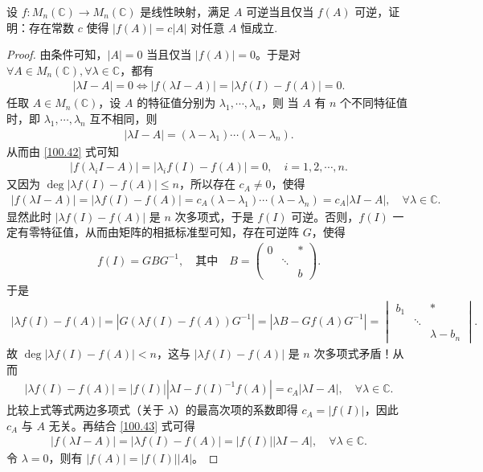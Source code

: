 \documentclass[../../main.tex]{subfiles}
\begin{document}
\begin{example}
设 $f: M_n(\mathbb{C}) \to M_n(\mathbb{C})$ 是线性映射，满足 $A$ 可逆当且仅当 $f(A)$ 可逆，证明：存在常数 $c$ 使得 $|f(A)| = c|A|$ 对任意 $A$ 恒成立. 
\end{example}
\begin{proof}
由条件可知，$|A| = 0$ 当且仅当 $|f(A)| = 0$。于是对 $\forall A \in M_n(\mathbb{C}), \forall \lambda \in \mathbb{C}$，都有
\begin{align}
|\lambda I - A| = 0 \Longleftrightarrow |f(\lambda I - A)| = |\lambda f(I) - f(A)| = 0. \label{100.42}
\end{align}
任取 $A \in M_n(\mathbb{C})$，设 $A$ 的特征值分别为 $\lambda_1, \cdots, \lambda_n$，则
当 $A$ 有 $n$ 个不同特征值时，即 $\lambda_1, \cdots, \lambda_n$ 互不相同，则
\begin{align*}
|\lambda I - A| = (\lambda - \lambda_1) \cdots (\lambda - \lambda_n).
\end{align*}
从而由 \eqref{100.42} 式可知
\begin{align*}
|f(\lambda_i I - A)| = |\lambda_i f(I) - f(A)| = 0, \quad i = 1, 2, \cdots, n.
\end{align*}
又因为 $\deg |\lambda f(I) - f(A)| \leqslant n$，所以存在 $c_A \ne 0$，使得
\begin{align}
|f(\lambda I - A)| = |\lambda f(I) - f(A)| = c_A (\lambda - \lambda_1) \cdots (\lambda - \lambda_n) = c_A |\lambda I - A|, \quad \forall \lambda \in \mathbb{C}. \label{100.43}
\end{align}
显然此时 $|\lambda f(I) - f(A)|$ 是 $n$ 次多项式，于是 $f(I)$ 可逆。否则，$f(I)$ 一定有零特征值，从而由矩阵的相抵标准型可知，存在可逆阵 $G$，使得
\begin{align*}
f(I) = G B G^{-1}, \quad \text{其中} \quad B = \begin{pmatrix}
0 & & * \\
& \ddots & \\
& & b
\end{pmatrix}.
\end{align*}
于是
\begin{align*}
|\lambda f(I) - f(A)| = |G (\lambda f(I) - f(A)) G^{-1}| = |\lambda B - G f(A) G^{-1}| = \begin{vmatrix}
b_1 & & * \\
& \ddots & \\
& & \lambda - b_n
\end{vmatrix}.
\end{align*}
故 $\deg |\lambda f(I) - f(A)| < n$，这与 $|\lambda f(I) - f(A)|$ 是 $n$ 次多项式矛盾！从而
\begin{align*}
|\lambda f(I) - f(A)| = |f(I)| |\lambda I - f(I)^{-1} f(A)| = c_A |\lambda I - A|, \quad \forall \lambda \in \mathbb{C}.
\end{align*}
比较上式等式两边多项式（关于 $\lambda$）的最高次项的系数即得 $c_A = |f(I)|$，因此 $c_A$ 与 $A$ 无关。再结合 \eqref{100.43} 式可得
\begin{align*}
|f(\lambda I - A)| = |\lambda f(I) - f(A)| = |f(I)| |\lambda I - A|, \quad \forall \lambda \in \mathbb{C}.
\end{align*}
令 $\lambda = 0$，则有 $|f(A)| = |f(I)| |A|$。


\end{proof}
\end{document}
